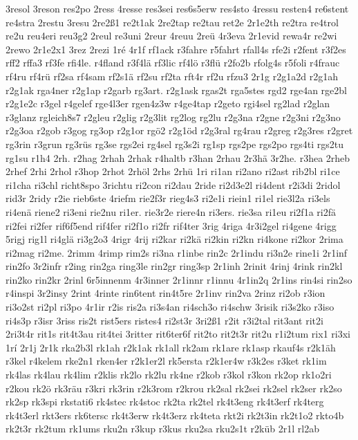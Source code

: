 {3resol
3reson
res2po
2ress
4resse
res3sei
res6s5erw
res4sto
4ressu
resten4
re6stent
re4stra
2restu
3resu
2re2ß1
re2t1ak
2re2tap
re2tau
ret2e
2r1e2th
re2tra
re4trol
re2u
reu4eri
reu3g2
2reul
re3uni
2reur
4reuu
2reü
4r3eva
2r1evid
rewa4r
re2wi
2rewo
2r1e2x1
3rez
2rezi
1ré
4r1f
rf1ack
r3fahre
r5fahrt
rfall4s
rfe2i
r2fent
r3f2es
rff2
rffa3
rf3fe
rfi4le.
r4fland
r3f4lä
rf3lic
rf4lö
r3flü
r2fo2b
rfolg4s
r5foli
r4frauc
rf4ru
rf4rü
rf2sa
rf4sam
rf2s1ä
rf2su
rf2ta
rft4r
rf2u
rfzu3
2r1g
r2g1a2d
r2g1ah
r2g1ak
rga4ner
r2g1ap
r2garb
rg3art.
r2g1ask
rgas2t
rga5stes
rgd2
rge4an
rge2bl
r2g1e2c
r3gel
r4gelef
rge4l3er
rgen4z3w
r4ge4tap
r2geto
rgi4sel
rg2lad
r2glan
r3glanz
rgleich8s7
r2gleu
r2glig
r2g3lit
rg2log
rg2lu
r2g3na
r2gne
r2g3ni
r2g3no
r2g3oa
r2gob
r3gog
rg3op
r2g1or
rgö2
r2g1öd
r2g3ral
rg4rau
r2greg
r2g3res
r2gret
rg3rin
r3grun
rg3rüs
rg3se
rgs2ei
rg4sel
rg3s2i
rg1sp
rgs2pe
rgs2po
rgs4ti
rgs2tu
rg1su
r1h4
2rh.
r2hag
2rhah
2rhak
r4haltb
r3han
2rhau
2r3hä
3r2he.
r3hea
2rheb
2rhef
2rhi
2rhol
r3hop
2rhot
2rhöl
2rhs
2rhü
1ri
ri1an
ri2ano
ri2ast
rib2bl
ri1ce
ri1cha
ri3chl
richt8spo
3richtu
ri2con
ri2dau
2ride
ri2d3e2l
ri4dent
r2i3di
2ridol
rid3r
2ridy
r2ie
rieb6ste
4riefm
rie2f3r
rieg4s3
ri2e1i
riein1
ri1el
rie3l2a
ri3els
ri4enä
riene2
ri3eni
rie2nu
ri1er.
rie3r2e
riere4n
ri3ers.
rie3sa
ri1eu
ri2f1a
ri2fä
ri2fei
ri2fer
rif6f5end
rif4fer
ri2f1o
ri2fr
rif4ter
3rig
4riga
4r3i2gel
ri4gene
4rigg
5rigj
rig1l
ri4glä
ri3g2o3
4rigr
4rij
ri2kar
ri2kä
ri2kin
ri2kn
ri4kone
ri2kor
2rima
ri2mag
ri2me.
2rimm
4rimp
rim2s
ri3na
r1inbe
rin2c
2r1indu
ri3n2e
rine1i
2r1inf
rin2fo
3r2infr
r2ing
rin2ga
ring3le
rin2gr
ring3sp
2r1inh
2rinit
4rinj
4rink
rin2kl
rin2ko
rin2kr
2rinl
6r5innenm
4r3inner
2r1innr
r1innu
4r1in2q
2r1ins
rin4si
rin2so
r4inspi
3r2insy
2rint
4rinte
rin6tent
rin4t5re
2r1inv
rin2va
2rinz
ri2ob
r3ion
ri3o2st
ri2pl
ri3po
4r1ir
r2is
ris2a
ri3s4an
ri4sch3o
ri4schw
3risik
ri3s2ko
r3iso
ri4s3p
r3isr
3riss
ris2t
rist5ers
ristes4
ri2st3r
3ri2ß1
r2it
r3i2tal
rit3ant
rit2i
2ri3t4r
rit1s
rit4t3au
rit4tei
3ritter
rit6ter6f
rit2to
rit2t3r
rit2u
r1i2tum
rix1
ri3xi
1rí
2r1j
2r1k
rka2b3l
rk1ah
r2k1ak
rk1all
rk2am
rk1are
rk1asp
rkauf4s
r2k1äh
r3kel
r4kelem
rke2n1
rken4er
r2k1er2l
rk5ersta
r2k1er4w
r3k2es
r3ket
rk1im
rk4las
rk4lau
rk4lim
r2klis
rk2lo
rk2lu
rk4ne
r2kob
r3kol
r3kon
rk2op
rk1o2ri
r2kou
rk2ö
rk3räu
r3kri
rk3rin
r2k3rom
r2krou
rk2sal
rk2sei
rk2sel
rk2ser
rk2so
rk2sp
rk3spi
rkstati6
rk4stec
rk4stoc
rk2ta
rk2tel
rk4t3eng
rk4t3erf
rk4terg
rk4t3erl
rkt3ers
rk6tersc
rk4t3erw
rk4t3erz
rk4teta
rkt2i
rk2t3in
rk2t1o2
rkto4b
rk2t3r
rk2tum
rk1ums
rku2n
r3kup
r3kus
rku2sa
rku2s1t
r2küb
2r1l
rl2ab
}
